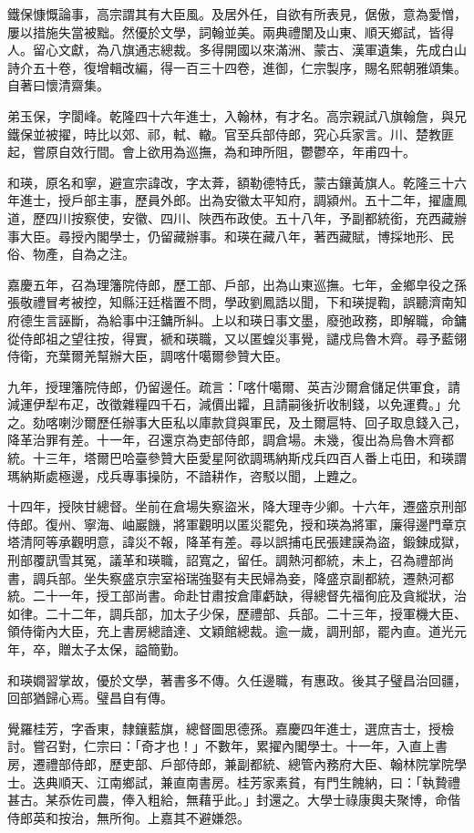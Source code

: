 \begin{pinyinscope}
鐵保慷慨論事，高宗謂其有大臣風。及居外任，自欲有所表見，倨傲，意為愛憎，屢以措施失當被黜。然優於文學，詞翰並美。兩典禮闈及山東、順天鄉試，皆得人。留心文獻，為八旗通志總裁。多得開國以來滿洲、蒙古、漢軍遺集，先成白山詩介五十卷，復增輯改編，得一百三十四卷，進御，仁宗製序，賜名熙朝雅頌集。自著曰懷清齋集。

弟玉保，字閬峰。乾隆四十六年進士，入翰林，有才名。高宗親試八旗翰詹，與兄鐵保並被擢，時比以郊、祁，軾、轍。官至兵部侍郎，究心兵家言。川、楚教匪起，嘗原自效行間。會上欲用為巡撫，為和珅所阻，鬱鬱卒，年甫四十。

和瑛，原名和寧，避宣宗諱改，字太葊，額勒德特氏，蒙古鑲黃旗人。乾隆三十六年進士，授戶部主事，歷員外郎。出為安徽太平知府，調潁州。五十二年，擢廬鳳道，歷四川按察使，安徽、四川、陜西布政使。五十八年，予副都統銜，充西藏辦事大臣。尋授內閣學士，仍留藏辦事。和瑛在藏八年，著西藏賦，博採地形、民俗、物產，自為之注。

嘉慶五年，召為理籓院侍郎，歷工部、戶部，出為山東巡撫。七年，金鄉皁役之孫張敬禮冒考被控，知縣汪廷楷置不問，學政劉鳳誥以聞，下和瑛提鞫，誤聽濟南知府德生言誣斷，為給事中汪鏞所糾。上以和瑛日事文墨，廢弛政務，即解職，命鏞從侍郎祖之望往按，得實，褫和瑛職，又以匿蝗災事覺，譴戍烏魯木齊。尋予藍翎侍衛，充葉爾羌幫辦大臣，調喀什噶爾參贊大臣。

九年，授理籓院侍郎，仍留邊任。疏言：「喀什噶爾、英吉沙爾倉儲足供軍食，請減運伊犁布疋，改徵雜糧四千石，減價出糶，且請嗣後折收制錢，以免運費。」允之。劾喀喇沙爾歷任辦事大臣私以庫款貸與軍民，及土爾扈特、回子取息錢入己，降革治罪有差。十一年，召還京為吏部侍郎，調倉場。未幾，復出為烏魯木齊都統。十三年，塔爾巴哈臺參贊大臣愛星阿欲調瑪納斯戍兵四百人番上屯田，和瑛謂瑪納斯處極邊，戍兵專事操防，不諳耕作，咨駁以聞，上韙之。

十四年，授陜甘總督。坐前在倉場失察盜米，降大理寺少卿。十六年，遷盛京刑部侍郎。復州、寧海、岫巖饑，將軍觀明以匿災罷免，授和瑛為將軍，廉得邊門章京塔清阿等承觀明意，諱災不報，降革有差。尋以誤捕屯民張建謨為盜，鍛鍊成獄，刑部覆訊雪其冤，議革和瑛職，詔寬之，留任。調熱河都統，未上，召為禮部尚書，調兵部。坐失察盛京宗室裕瑞強娶有夫民婦為妾，降盛京副都統，遷熱河都統。二十一年，授工部尚書。命赴甘肅按倉庫虧缺，得總督先福徇庇及貪縱狀，治如律。二十二年，調兵部，加太子少保，歷禮部、兵部。二十三年，授軍機大臣、領侍衛內大臣，充上書房總諳達、文穎館總裁。逾一歲，調刑部，罷內直。道光元年，卒，贈太子太保，謚簡勤。

和瑛嫺習掌故，優於文學，著書多不傳。久任邊職，有惠政。後其子璧昌治回疆，回部猶歸心焉。璧昌自有傳。

覺羅桂芳，字香東，隸鑲藍旗，總督圖思德孫。嘉慶四年進士，選庶吉士，授檢討。嘗召對，仁宗曰：「奇才也！」不數年，累擢內閣學士。十一年，入直上書房，遷禮部侍郎，歷吏部、戶部侍郎，兼副都統、總管內務府大臣、翰林院掌院學士。迭典順天、江南鄉試，兼直南書房。桂芳家素貧，有門生餽納，曰：「執贄禮甚古。某忝佐司農，俸入粗給，無藉乎此。」封還之。大學士祿康輿夫聚博，命偕侍郎英和按治，無所徇。上嘉其不避嫌怨。


\end{pinyinscope}

